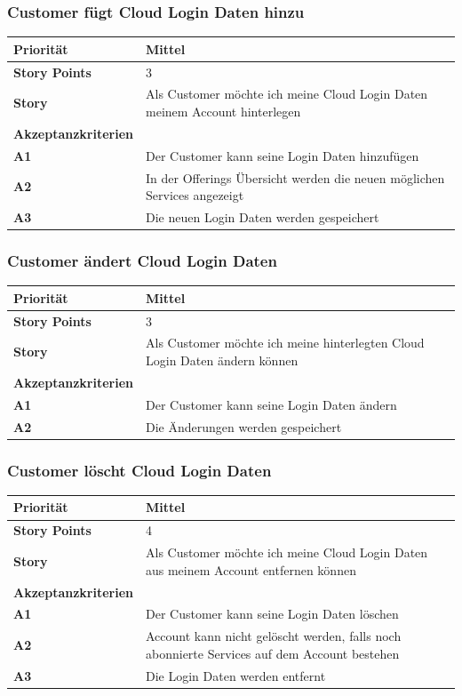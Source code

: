 \documentclass[11pt]{scrartcl}
\begin{document}
 \subsubsection{Customer fügt Cloud Login Daten hinzu}
\begin{tabularx}{\linewidth}{l X}
  \textbf{Priorität} & Mittel\\
  \hline
  \textbf{Story Points} & 3\\
  \hline
  \textbf{Story}& Als Customer möchte ich meine Cloud Login Daten meinem Account hinterlegen\\
  \hline
    \textbf{Akzeptanzkriterien} & \\
    \hline
  \textbf{A1} & Der Customer kann seine Login Daten hinzufügen\\
  \hline
  \textbf{A2} & In der Offerings Übersicht werden die neuen möglichen Services 
  angezeigt\\
  \hline
    \textbf{A3} & Die neuen Login Daten werden gespeichert\\
  \hline
   \end{tabularx}
 \subsubsection{Customer ändert Cloud Login Daten}
\begin{tabularx}{\linewidth}{l X}
  \textbf{Priorität} & Mittel\\
  \hline
  \textbf{Story Points} & 3\\
  \hline
  \textbf{Story}& Als Customer möchte ich meine hinterlegten Cloud Login Daten ändern können\\
  \hline
    \textbf{Akzeptanzkriterien} & \\
    \hline
  \textbf{A1} & Der Customer kann seine Login Daten ändern\\
  \hline
    \textbf{A2} & Die Änderungen werden gespeichert\\
  \hline
   \end{tabularx}
 \subsubsection{Customer löscht Cloud Login Daten}
\begin{tabularx}{\linewidth}{l X}
  \textbf{Priorität} & Mittel\\
  \hline
  \textbf{Story Points} & 4\\
  \hline
  \textbf{Story}& Als Customer möchte ich meine Cloud Login Daten aus meinem Account entfernen können\\
  \hline
    \textbf{Akzeptanzkriterien} & \\
    \hline
  \textbf{A1} & Der Customer kann seine Login Daten löschen\\
  \hline
  \textbf{A2} & Account kann nicht gelöscht werden, falls noch abonnierte Services auf dem Account bestehen\\
  \hline
    \textbf{A3} & Die Login Daten werden entfernt\\
  \hline
   \end{tabularx}
\end{document}

